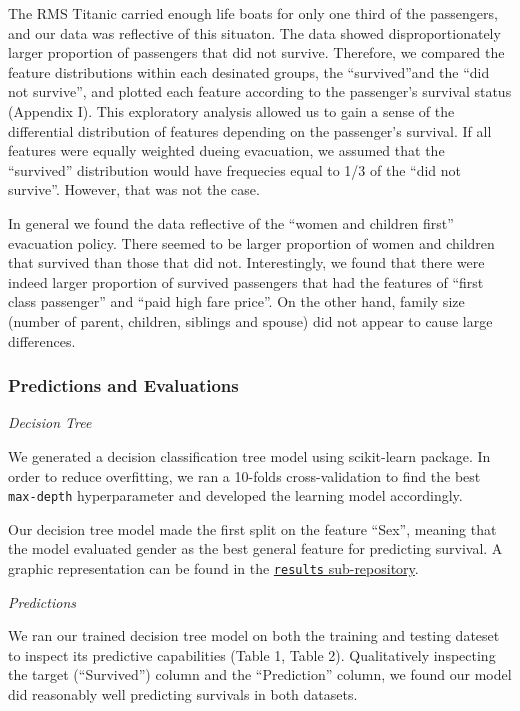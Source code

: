 \documentclass[]{article}
\begin{document}
The RMS Titanic carried enough life boats for only one third of the
passengers, and our data was reflective of this situaton. The data
showed disproportionately larger proportion of passengers that did not
survive. Therefore, we compared the feature distributions within each
desinated groups, the ``survived''and the ``did not survive'', and
plotted each feature according to the passenger's survival status
(Appendix I). This exploratory analysis allowed us to gain a sense of
the differential distribution of features depending on the passenger's
survival. If all features were equally weighted dueing evacuation, we
assumed that the ``survived'' distribution would have frequecies equal
to 1/3 of the ``did not survive''. However, that was not the case.

In general we found the data reflective of the ``women and children
first'' evacuation policy. There seemed to be larger proportion of women
and children that survived than those that did not. Interestingly, we
found that there were indeed larger proportion of survived passengers
that had the features of ``first class passenger'' and ``paid high fare
price''. On the other hand, family size (number of parent, children,
siblings and spouse) did not appear to cause large differences.

\newpage

\subsubsection{Predictions and
Evaluations}\label{predictions-and-evaluations}

\emph{Decision Tree}

We generated a decision classification tree model using scikit-learn
package. In order to reduce overfitting, we ran a 10-folds
cross-validation to find the best \texttt{max-depth} hyperparameter and
developed the learning model accordingly.

Our decision tree model made the first split on the feature ``Sex'',
meaning that the model evaluated gender as the best general feature for
predicting survival. A graphic representation can be found in the
\href{https://github.com/UBC-MDS/sylvia_patrick_Titanic_Survival_ML/blob/master/results/decision_tree.png}{\texttt{results}
sub-repository}.

\emph{Predictions}

We ran our trained decision tree model on both the training and testing
dateset to inspect its predictive capabilities (Table 1, Table 2).
Qualitatively inspecting the target (``Survived'') column and the
``Prediction'' column, we found our model did reasonably well predicting
survivals in both datasets.
\end{document}
